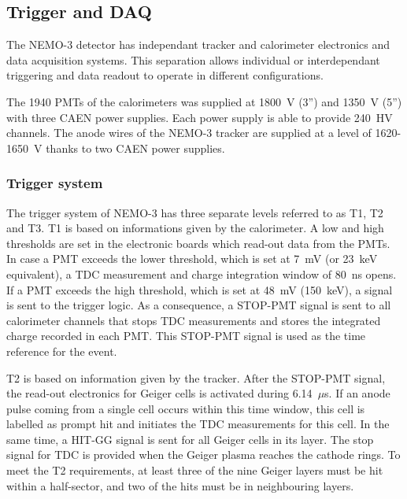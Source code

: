 \documentclass[main.tex]{subfiles}
\begin{document}
\FloatBarrier


\subsection{Trigger and DAQ}\label{sec:triggerAndDAQ}


\NI The NEMO-3 detector has independant tracker and calorimeter electronics and data acquisition systems. This separation allows individual or interdependant triggering and data readout to operate in different configurations. 


\bigskip


\NI The 1940 PMTs of the calorimeters was supplied at 1800~V (3'') and 1350~V (5'') with three CAEN power supplies. Each power supply is able to provide 240~HV channels. The anode wires of the NEMO-3 tracker are supplied at a level of 1620-1650~V thanks to two CAEN power supplies. 


\subsubsection{Trigger system}


\NI The trigger system of NEMO-3 has three separate levels referred to as T1, T2 and T3. T1 is based on informations given by the calorimeter. A low and high thresholds are set in the electronic boards which read-out data from the PMTs. In case a PMT exceeds the lower threshold, which is set at 7~mV (or 23~keV equivalent), a TDC measurement and charge integration window of 80~ns opens. If a PMT exceeds the high threshold, which is set at 48~mV (150~keV), a signal is sent to the trigger logic. As a consequence, a STOP-PMT signal is sent to all calorimeter channels that stops TDC measurements and stores the integrated charge recorded in each PMT. This STOP-PMT signal is used as the time reference for the event.


\bigskip


\NI T2 is based on information given by the tracker. After the STOP-PMT signal, the read-out electronics for Geiger cells is activated during 6.14~$\mu$s. If an anode pulse coming from a single cell occurs within this time window, this cell is labelled as prompt hit and initiates the TDC measurements for this cell. In the same time, a HIT-GG signal is sent for all Geiger cells in its layer. The stop signal for TDC is provided when the Geiger plasma reaches the cathode rings. To meet the T2 requirements, at least three of the nine Geiger layers must be hit within a half-sector, and two of the hits must be in neighbouring layers.
\end{document}
